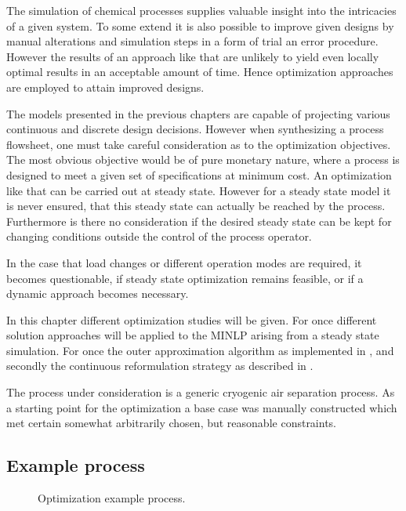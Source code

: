 The simulation of chemical processes supplies valuable insight into the intricacies of a given system.
To some extend it is also possible to improve given designs by manual alterations and simulation
steps in a form of trial an error procedure. However the results of an approach like that are unlikely
to yield even locally optimal results in an acceptable amount of time. Hence optimization approaches
are employed to attain improved designs.

The models presented in the previous chapters are capable of projecting various continuous and
discrete design decisions. However when synthesizing a process flowsheet, one must take careful
consideration as to the optimization objectives. The most obvious objective would be of
pure monetary nature, where a process is designed to meet a given set of specifications
at minimum cost. An optimization like that can be carried out at steady state. However for
a steady state model it is never ensured, that this steady state can actually be reached
by the process. Furthermore is there no consideration if the desired steady state can be kept for
changing conditions outside the control of the process operator.

In the case that load changes or different operation modes are required, it becomes questionable,
if steady state optimization remains feasible, or if a dynamic approach becomes necessary.

In this chapter different optimization studies will be given. For once different solution approaches
will be applied to the MINLP arising from a steady state simulation. For once the outer approximation
algorithm as implemented in \gproms, and secondly the continuous reformulation strategy as described
in .

The process under consideration is a generic cryogenic air separation process. As a starting point for the
optimization a base case was manually constructed which met certain somewhat arbitrarily chosen,
but reasonable constraints.

    \subsection{Example process}
    \begin{figure}
        \footnotesize
        \center
        
        \caption{Optimization example process.}
        \label{fig:opt:exppro}
    \end{figure}
    

